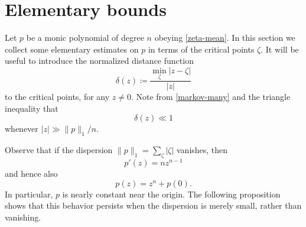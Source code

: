 \documentclass[12pt]{amsart}
\newcommand{\eps}{\varepsilon}
\begin{document}


\section{Elementary bounds}\label{elem-sec}

Let $p$ be a monic polynomial of degree $n$ obeying \eqref{zeta-mean}.  In this section we collect some elementary estimates on $p$ in terms of the critical points $\zeta$.  It will be useful to introduce the normalized distance function
\begin{equation}\label{delta-def}
    \delta(z) \coloneqq \frac{\min_\zeta |z-\zeta|}{|z|}
\end{equation}
to the critical points, for any $z \neq 0$.  Note from \eqref{markov-many} and the triangle inequality that
\begin{equation}\label{delta-upper}
    \delta(z) \ll 1
\end{equation}
whenever $|z| \gg \|p\|_1/n$.

Observe that if the dispersion $\|p\|_1 = \sum_\zeta |\zeta|$ vanishes, then
$$ p'(z) = nz^{n-1}$$
and hence also
$$ p(z) = z^n + p(0).$$
In particular, $p$ is nearly constant near the origin.  The following proposition shows that this behavior persists when the dispersion is merely small, rather than vanishing.
\end{document}
